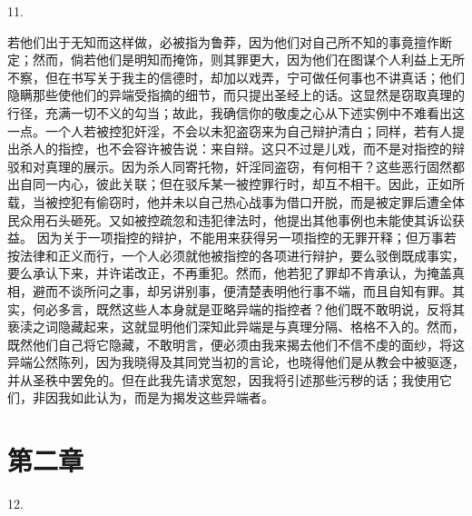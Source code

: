 11. \par

若他们出于无知而这样做，必被指为鲁莽，因为他们对自己所不知的事竟擅作断定；然而，倘若他们是明知而掩饰，则其罪更大，因为他们在图谋个人利益上无所不察，但在书写关于我主的信德时，却加以戏弄，宁可做任何事也不讲真话；他们隐瞒那些使他们的异端受指摘的细节，而只提出圣经上的话。这显然是窃取真理的行径，充满一切不义的勾当；故此，我确信你的敬虔之心从下述实例中不难看出这一点。一个人若被控犯奸淫，不会以未犯盗窃来为自己辩护清白；同样，若有人提出杀人的指控，也不会容许被告说：来自辩。这只不过是儿戏，而不是对指控的辩驳和对真理的展示。因为杀人同寄托物，奸淫同盗窃，有何相干？这些恶行固然都出自同一内心，彼此关联；但在驳斥某一被控罪行时，却互不相干。因此，正如所载，当被控犯有偷窃时，他并未以自己热心战事为借口开脱，而是被定罪后遭全体民众用石头砸死。又如被控疏忽和违犯律法时，他提出其他事例也未能使其诉讼获益。 因为关于一项指控的辩护，不能用来获得另一项指控的无罪开释；但万事若按法律和正义而行，一个人必须就他被指控的各项进行辩护，要么驳倒既成事实，要么承认下来，并许诺改正，不再重犯。然而，他若犯了罪却不肯承认，为掩盖真相，避而不谈所问之事，却另讲别事，便清楚表明他行事不端，而且自知有罪。其实，何必多言，既然这些人本身就是亚略异端的指控者？他们既不敢明说，反将其亵渎之词隐藏起来，这就显明他们深知此异端是与真理分隔、格格不入的。然而，既然他们自己将它隐藏，不敢明言，便必须由我来揭去他们不信不虔的面纱，将这异端公然陈列，因为我晓得及其同党当初的言论，也晓得他们是从教会中被驱逐，并从圣秩中罢免的。但在此我先请求宽恕，因我将引述那些污秽的话；我使用它们，非因我如此认为，而是为揭发这些异端者。\par


\section{第二章}

12. \par

